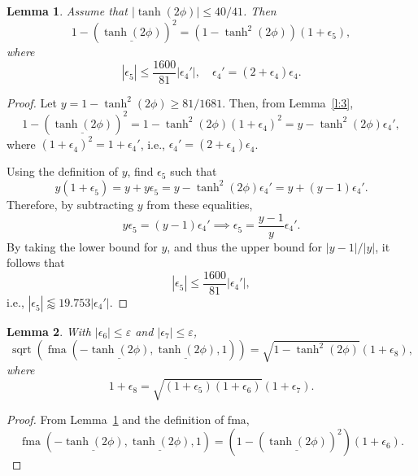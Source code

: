 \documentclass[a4paper,12pt,twoside]{article}
\newtheorem{lem}{Lemma}
\begin{document}
\begin{lem}\label{l:4}
  Assume that $|\tanh(2\phi)|\le 40/41$.  Then
  \begin{displaymath}
    1-(\underline{\tanh(2\phi)})^2=(1-\tanh^2(2\phi))(1+\epsilon_5),
  \end{displaymath}
  where
  \begin{equation}
    |\epsilon_5^{}|\le\frac{1600}{81}|\epsilon_4'|,\quad\epsilon_4'=(2+\epsilon_4^{})\epsilon_4^{}.
    \label{e:22}
  \end{equation}
\end{lem}
\begin{proof}
  Let $y=1-\tanh^2(2\phi)\ge 81/1681$.  Then, from Lemma~\ref{l:3},
  \begin{displaymath}
    1-(\underline{\tanh(2\phi)})^2=1-\tanh^2(2\phi)(1+\epsilon_4^{})^2=y-\tanh^2(2\phi)\epsilon_4',
  \end{displaymath}
  where $(1+\epsilon_4^{})^2=1+\epsilon_4'$, i.e.,
  $\epsilon_4'=(2+\epsilon_4^{})\epsilon_4^{}$.

  Using the definition of $y$, find $\epsilon_5$ such that
  \begin{displaymath}
    y(1+\epsilon_5^{})=y+y\epsilon_5^{}=y-\tanh^2(2\phi)\epsilon_4'=y+(y-1)\epsilon_4'.
  \end{displaymath}
  Therefore, by subtracting $y$ from these equalities,
  \begin{displaymath}
    y\epsilon_5^{}=(y-1)\epsilon_4'\implies\epsilon_5^{}=\frac{y-1}{y}\epsilon_4'.
  \end{displaymath}
  By taking the lower bound for $y$, and thus the upper bound for
  $|y-1|/|y|$, it follows that
  \begin{displaymath}
    |\epsilon_5^{}|\le\frac{1600}{81}|\epsilon_4'|,
  \end{displaymath}
  i.e., $|\epsilon_5^{}|\lessapprox 19.753|\epsilon_4'|$.
\end{proof}

\begin{lem}\label{l:5}
  With $|\epsilon_6|\le\varepsilon$ and $|\epsilon_7|\le\varepsilon$,
  \begin{displaymath}
    \mathop{\mathrm{sqrt}}(\mathop{\mathrm{fma}}(-\underline{\tanh(2\phi)},\underline{\tanh(2\phi)},1))=\sqrt{1-\tanh^2(2\phi)}(1+\epsilon_8),
  \end{displaymath}
  where
  \begin{displaymath}
    1+\epsilon_8=\sqrt{(1+\epsilon_5)(1+\epsilon_6)}(1+\epsilon_7).
  \end{displaymath}
\end{lem}
\begin{proof}
  From Lemma~\ref{l:4} and the definition of $\mathrm{fma}$,
  \begin{displaymath}
    \mathop{\mathrm{fma}}(-\underline{\tanh(2\phi)},\underline{\tanh(2\phi)},1)=(1-(\underline{\tanh(2\phi)})^2)(1+\epsilon_6).
  \end{displaymath}
\end{proof}
\end{document}
